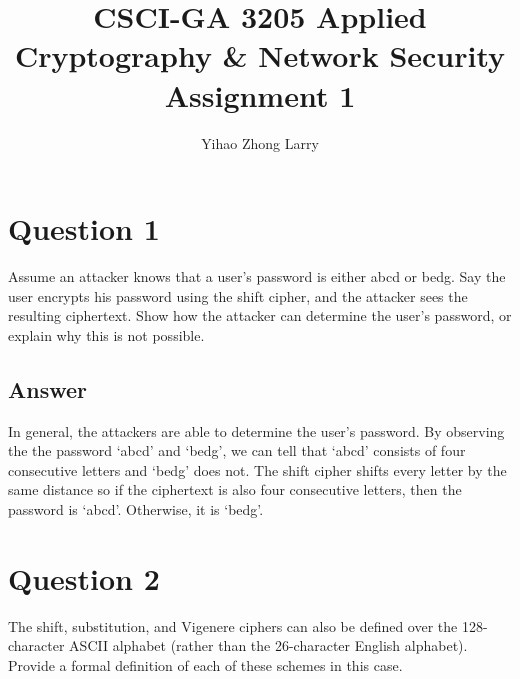 \documentclass{article}
\begin{document}
\title{CSCI-GA 3205 Applied Cryptography & Network Security
Assignment 1}
\author{Yihao Zhong Larry}


\section{Question 1}
 Assume an attacker knows that a user’s password is either abcd or bedg. Say the user encrypts his password using the shift cipher, and the attacker sees the resulting ciphertext. Show how the attacker can determine the user’s password, or explain why this is not possible.

\subsection{Answer}
In general, the attackers are able to determine the user’s password. By observing the the password ‘abcd’ and ‘bedg’, we can tell that ‘abcd’ consists of four consecutive letters and ‘bedg’ does not. The shift cipher shifts every letter by the same distance so if the ciphertext is also four consecutive letters, then the password is ‘abcd’. Otherwise, it is ‘bedg’.

\section{Question 2}
The shift, substitution, and Vigenere ciphers can also be defined over the 128-character ASCII alphabet (rather than the 26-character English alphabet). Provide a formal definition of each of these schemes in this case.
\end{document}

